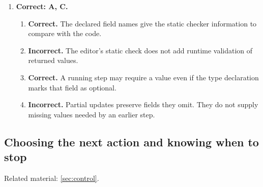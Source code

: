 \begin{enumerate}[start=11,itemsep=0.7\baselineskip]
\item[{\hyperref[exercise:20]{20.}}] \begin{minipage}[t]{\linewidth}
\textbf{Correct: A, C.}
\begin{enumerate}[label=\textnormal{(\Alph*)},leftmargin=*,itemsep=0pt]
\item \textbf{Correct.} The declared field names give the static checker information to compare with the code.
\item \textbf{Incorrect.} The editor's static check does not add runtime validation of returned values.
\item \textbf{Correct.} A running step may require a value even if the type declaration marks that field as optional.
\item \textbf{Incorrect.} Partial updates preserve fields they omit. They do not supply missing values needed by an earlier step.
\end{enumerate}
\end{minipage}

\end{enumerate}

\subsection{Choosing the next action and knowing when to stop}
\noindent Related material: \cref{sec:control}.

